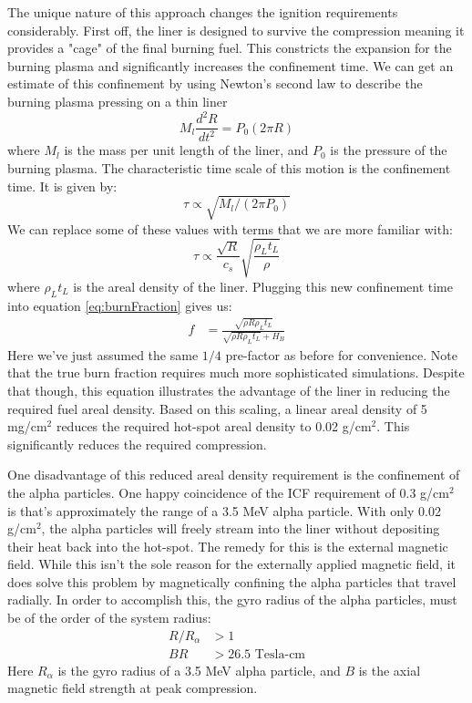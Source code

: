 	The unique nature of this approach changes the ignition requirements considerably. First off, the liner is designed to survive the compression meaning it provides a "cage" of the final burning fuel. This constricts the expansion for the burning plasma and significantly increases the confinement time. We can get an estimate of this confinement by using Newton's second law to describe the burning plasma pressing on a thin liner 
	\begin{equation}
		M_l\frac{d^2R}{dt^2} = P_0(2\pi R)
	\end{equation}
	where $M_l$ is the mass per unit length of the liner, and $P_0$ is the pressure of the burning plasma. The characteristic time scale of this motion is the confinement time. It is given by:
	\begin{equation}
		\tau \propto \sqrt{M_l / (2\pi P_0)}
	\end{equation}
	We can replace some of these values with terms that we are more familiar with:
	\begin{equation}
		\tau \propto \frac{\sqrt{R}}{c_s}\sqrt{\frac{\rho_Lt_L}{\rho}}
	\end{equation}
	where $\rho_Lt_L$ is the areal density of the liner. Plugging this new confinement time into equation \ref{eq:burnFraction} gives us:
	\begin{equation}
		\begin{split}
			f &= \frac{\sqrt{\rho R \rho_Lt_L}}{\sqrt{\rho R \rho_Lt_L} + H_B}
		\end{split}
	\end{equation}
	Here we've just assumed the same $1/4$ pre-factor as before for convenience. Note that the true burn fraction requires much more sophisticated simulations. Despite that though, this equation illustrates the advantage of the liner in reducing the required fuel areal density. Based on this scaling, a linear areal density of 5 mg/cm$^2$ reduces the required hot-spot areal density to 0.02 g/cm$^2$. This significantly reduces the required compression.
	
	One disadvantage of this reduced areal density requirement is the confinement of the alpha particles. One happy coincidence of the ICF requirement of 0.3 g/cm$^2$ is that's approximately the range of a 3.5 MeV alpha particle. With only 0.02 g/cm$^2$, the alpha particles will freely stream into the liner without depositing their heat back into the hot-spot. The remedy for this is the external magnetic field. While this isn't the sole reason for the externally applied magnetic field, it does solve this problem by magnetically confining the alpha particles that travel radially. In order to accomplish this, the gyro radius of the alpha particles, must be of the order of the system radius:
	\begin{equation}
		\begin{split}			
			R / R_\alpha &> 1 \\
			BR &> 26.5 \text{ Tesla-cm}
		\end{split}
	\end{equation}
	Here $R_\alpha$ is the gyro radius of a 3.5 MeV alpha particle, and $B$ is the axial magnetic field strength at peak compression. 
	
